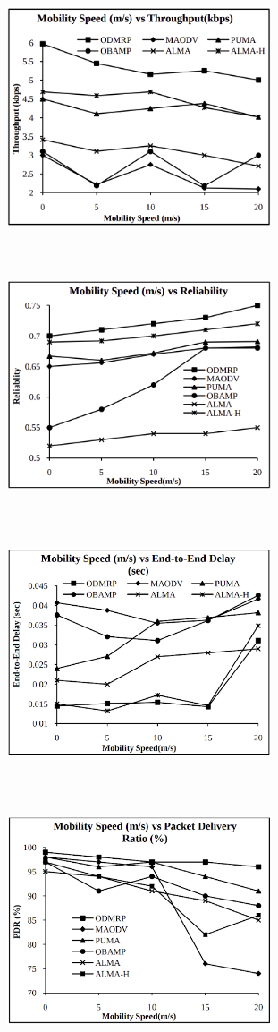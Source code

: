 \begin{figure}[!htbp]%
    \centering
    \includegraphics[width=7.8cm, height=7.8cm]{images/throughput-vs-mobility.png}
    \includegraphics[width=7.8cm, height=7.8cm]{images/reliability-vs-mobility.png}
    \includegraphics[width=7.8cm, height=7.8cm]{images/mobility-vs-e2edelay.png}
    \includegraphics[width=7.8cm, height=7.8cm]{images/mobility-vs-pdr.png}

\end{figure}
